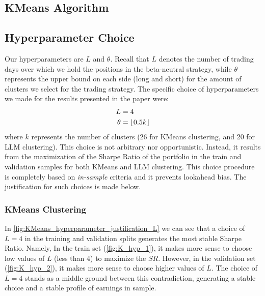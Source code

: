 \subsection{KMeans Algorithm}

%

\newpage
\subsection{Hyperparameter Choice}
Our hyperparameters are $L$ and $\theta$. Recall that $L$ denotes the number of trading days over which we hold the positions in the beta-neutral strategy, while $\theta$ represents the upper bound on each side (long and short) for the amount of clusters we select for the trading strategy. The specific choice of hyperparameters we made for the results presented in the paper were:
\begin{align*}
L &= 4
\\
\theta &= \lfloor 0.5k \rfloor
\end{align*}
where $k$ represents the number of clusters (26 for KMeans clustering, and 20 for LLM clustering). This choice is not arbitrary nor opportunistic. Instead, it results from the maximization of the Sharpe Ratio of the portfolio in the train and validation samples for both KMeans and LLM clustering. This choice procedure is completely based on \textit{in-sample} criteria and it prevents lookahead bias. The justification for such choices is made below.

\subsubsection{KMeans Clustering}

In \cref{fig:KMeans_hyperparameter_justification_L} we can see that a choice of $L=4$ in the training and validation splits generates the most stable Sharpe Ratio. Namely, In the train set (\cref{fig:K_hyp_1}), it makes more sense to choose low values of $L$ (less than 4) to maximize the $SR$. However, in the validation set (\cref{fig:K_hyp_2}), it makes more sense to choose higher values of $L$. The choice of $L=4$ stands as a middle ground between this contradiction, generating a stable choice and a stable profile of earnings in sample.

